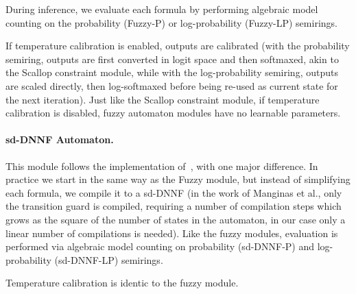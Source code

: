 During inference, we evaluate each formula by performing algebraic model counting on the probability (Fuzzy-P) or log-probability (Fuzzy-LP) semirings.

If temperature calibration is enabled, outputs are calibrated (with the probability semiring, outputs are first converted in logit space and then softmaxed, akin to the Scallop constraint module, while with the log-probability semiring, outputs are scaled directly, then log-softmaxed before being re-used as current state for the next iteration). Just like the Scallop constraint module, if temperature calibration is disabled, fuzzy automaton modules have no learnable parameters.

\paragraph{sd-DNNF Automaton.}
This module follows the implementation of~\cite{manginas2024nesya}, with one major difference. In practice we start in the same way as the Fuzzy module, but instead of simplifying each formula, we compile it to a sd-DNNF (in the work of Manginas et al., only the transition guard is compiled, requiring a number of compilation steps which grows as the square of the number of states in the automaton, in our case only a linear number of compilations is needed).
Like the fuzzy modules, evaluation is performed via algebraic model counting on probability (sd-DNNF-P) and log-probability (sd-DNNF-LP) semirings.

Temperature calibration is identic to the fuzzy module.